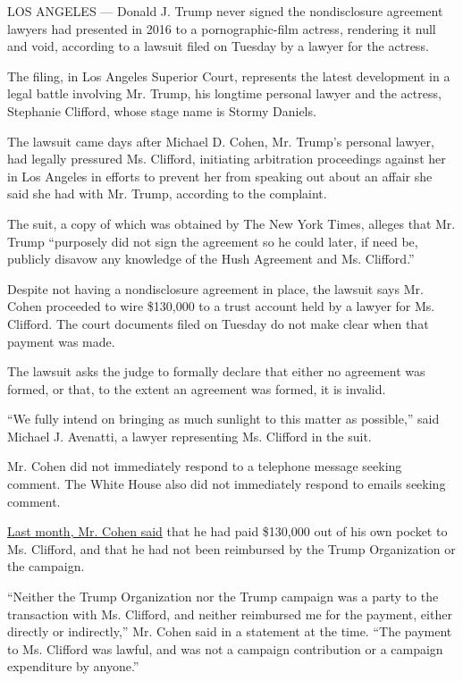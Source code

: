 LOS ANGELES --- Donald J. Trump never signed the nondisclosure agreement
lawyers had presented in 2016 to a pornographic-film actress, rendering
it null and void, according to a lawsuit filed on Tuesday by a lawyer
for the actress.

The filing, in Los Angeles Superior Court, represents the latest
development in a legal battle involving Mr. Trump, his longtime personal
lawyer and the actress, Stephanie Clifford, whose stage name is Stormy
Daniels.

The lawsuit came days after Michael D. Cohen, Mr. Trump's personal
lawyer, had legally pressured Ms. Clifford, initiating arbitration
proceedings against her in Los Angeles in efforts to prevent her from
speaking out about an affair she said she had with Mr. Trump, according
to the complaint.

The suit, a copy of which was obtained by The New York Times, alleges
that Mr. Trump ``purposely did not sign the agreement so he could later,
if need be, publicly disavow any knowledge of the Hush Agreement and Ms.
Clifford.''

Despite not having a nondisclosure agreement in place, the lawsuit says
Mr. Cohen proceeded to wire \$130,000 to a trust account held by a
lawyer for Ms. Clifford. The court documents filed on Tuesday do not
make clear when that payment was made.

The lawsuit asks the judge to formally declare that either no agreement
was formed, or that, to the extent an agreement was formed, it is
invalid.

``We fully intend on bringing as much sunlight to this matter as
possible,'' said Michael J. Avenatti, a lawyer representing Ms. Clifford
in the suit.

Mr. Cohen did not immediately respond to a telephone message seeking
comment. The White House also did not immediately respond to emails
seeking comment.

\href{https://www.nytimes3xbfgragh.onion/2018/02/13/us/politics/stormy-daniels-michael-cohen-trump.html}{Last
month, Mr. Cohen said} that he had paid \$130,000 out of his own pocket
to Ms. Clifford, and that he had not been reimbursed by the Trump
Organization or the campaign.

``Neither the Trump Organization nor the Trump campaign was a party to
the transaction with Ms. Clifford, and neither reimbursed me for the
payment, either directly or indirectly,'' Mr. Cohen said in a statement
at the time. ``The payment to Ms. Clifford was lawful, and was not a
campaign contribution or a campaign expenditure by anyone.''

